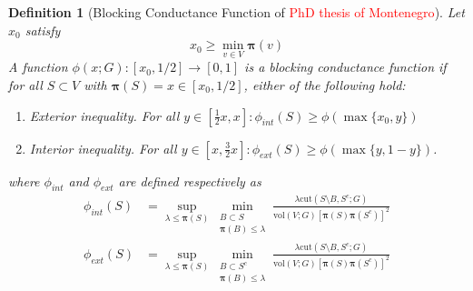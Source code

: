 \documentclass{article}
\newcommand{\vol}{\mathrm{vol}}
\newcommand{\1}{\mathbf{1}}
\newcommand{\cut}{\mathrm{cut}}
\newcommand{\pibf}{\bm{\pi}}
\theoremstyle{aldenthm}
\newtheorem{definition}{Definition}
\begin{document}
\begin{definition}[Blocking Conductance Function of \textcolor{red}{PhD thesis of Montenegro}]
	\label{def: bcf}
	Let $x_0$ satisfy
	\begin{equation*}
	x_0 \geq \min_{v \in V} \pibf(v)
	\end{equation*}
	A function $\phi(x; G): [x_0, 1/2] \to [0,1]$ is a \emph{blocking conductance function} if for all $S \subset V$ with $\pibf(S) = x \in [x_0, 1/2]$, either of the following hold: 
	\begin{enumerate}
		\item \emph{Exterior inequality.} For all $y \in \left[\frac{1}{2}x, x\right]: \phi_{int}(S) \geq \phi(\max\{x_0,y\})$
		\item \emph{Interior inequality.} For all $y  \in \left[x, \frac{3}{2}x\right]: \phi_{ext}(S) \geq \phi(\max\{y,1 -y\})$.
	\end{enumerate}
	where $\phi_{int}$ and $\phi_{ext}$ are defined respectively as
	\begin{align*}
	\phi_{int}(S) & = \sup_{\lambda \leq \pibf(S)} \min_{\substack{B \subset S \\ \pibf(B) \leq \lambda} } \frac{\lambda \cut(S \setminus B, S^c; G)}{\vol(V; G) \left[\pibf(S) \pibf(S^c)\right]^2} \\
	\phi_{ext}(S) & = \sup_{\lambda \leq \pibf(S)} \min_{\substack{B \subset S^c \\ \pibf(B) \leq \lambda} } \frac{\lambda \cut(S \setminus B, S^c; G)}{\vol(V; G) \left[\pibf(S) \pibf(S^c)\right]^2}
	\end{align*}
\end{definition}
\end{document}
